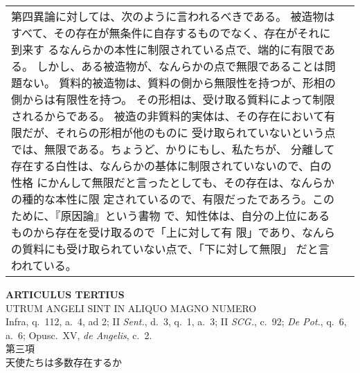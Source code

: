 \documentclass[10pt]{jsarticle} %
\begin{document}
\begin{longtable}{p{21em}p{21em}}
第四異論に対しては、次のように言われるべきである。
被造物はすべて、その存在が無条件に自存するものでなく、存在がそれに到来す
 るなんらかの本性に制限されている点で、端的に有限である。
しかし、ある被造物が、なんらかの点で無限であることは問題ない。
質料的被造物は、質料の側から無限性を持つが、形相の側からは有限性を持つ。
 その形相は、受け取る質料によって制限されるからである。
被造の非質料的実体は、その存在において有限だが、それらの形相が他のものに
 受け取られていないという点では、無限である。ちょうど、かりにもし、私たちが、
 分離して存在する白性は、なんらかの基体に制限されていないので、白の性格
 にかんして無限だと言ったとしても、その存在は、なんらかの種的な本性に限
 定されているので、有限だったであろう。このために、『原因論』という書物
 で、知性体は、自分の上位にあるものから存在を受け取るので「上に対して有
 限」であり、なんらの質料にも受け取られていない点で、「下に対して無限」
 だと言われている。

\end{longtable}
\newpage



\begin{center}
 {\Large {\bf ARTICULUS TERTIUS}}\\
 {\large UTRUM ANGELI SINT IN ALIQUO MAGNO NUMERO}\\
 {\footnotesize Infra, q.~112, a.~4, ad 2; II {\itshape Sent.}, d.~3,
 q.~1, a.~3; II {\itshape SCG.}, c.~92; {\itshape De Pot.}, q.~6, a.~6;
 Opusc.~XV, {\itshape de Angelis}, c.~2.}\\
 {\Large 第三項\\天使たちは多数存在するか}
\end{center}
\end{document}
